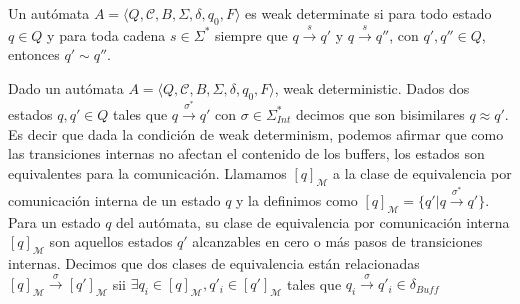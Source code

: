 \begin{definition} \cite{comm} Un autómata $A= \langle Q, \mathcal{C}, B, \Sigma, \delta, q_0, F \rangle$ es weak determinate si para todo estado $q \in Q$ y para toda cadena $s \in \Sigma^*$ siempre que $q \xrightarrow{s} q'$ y $q \xrightarrow{s} q''$, con $q',q'' \in Q$, entonces $q' \sim q''$.
\end{definition}


\begin{definition}
Dado un autómata $A = \langle Q, \mathcal{C}, B, \Sigma, \delta, q_0, F \rangle$, weak deterministic. Dados dos estados $q, q' \in Q$ tales que $q \xrightarrow{\sigma^*} q'$ con $\sigma \in \Sigma_{\mathit{Int}}^*$ decimos que son bisimilares $q \approx q'$. Es decir que dada la condición de weak determinism, podemos afirmar que como las transiciones internas no afectan el contenido de los buffers, los estados son equivalentes para la comunicación. Llamamos $[q]_\mathcal{M}$ a la clase de equivalencia por comunicación interna de un estado $q$ y la definimos como $[q]_\mathcal{M}= \{q'| q \xrightarrow{\sigma^*} q'\}$. Para un estado $q$ del autómata, su clase de equivalencia por comunicación interna $[q]_\mathcal{M}$ son aquellos estados $q'$ alcanzables en cero o más pasos de transiciones internas. Decimos que dos clases de equivalencia están relacionadas $[q]_\mathcal{M} \xrightarrow{\sigma} [q']_\mathcal{M}$ sii $\exists q_i \in [q]_\mathcal{M}, q'_i \in [q']_\mathcal{M}$ tales que $q_i \xrightarrow{\sigma} q'_i \in \delta_{Buff}$
\end{definition}

